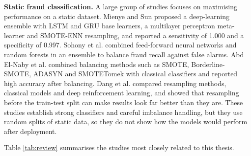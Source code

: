 \textbf{Static fraud classification.} A large group of studies focuses on maximising performance on a static dataset. Mienye and Sun \cite{mienye2023} proposed a deep-learning ensemble with LSTM and GRU base learners, a multilayer perceptron meta-learner and SMOTE-ENN resampling, and reported a sensitivity of 1.000 and a specificity of 0.997. Sohony et al. \cite{sohony2018} combined feed-forward neural networks and random forests in an ensemble to balance fraud recall against false alarms. Abd El-Naby et al. \cite{abdelnaby2023} combined balancing methods such as SMOTE, Borderline-SMOTE, ADASYN and SMOTETomek with classical classifiers and reported high accuracy after balancing. Dang et al. \cite{dang2021} compared resampling methods, classical models and deep reinforcement learning, and showed that resampling before the train-test split can make results look far better than they are. These studies establish strong classifiers and careful imbalance handling, but they use random splits of static data, so they do not show how the models would perform after deployment.

Table \ref{tab:review} summarises the studies most closely related to this thesis.

